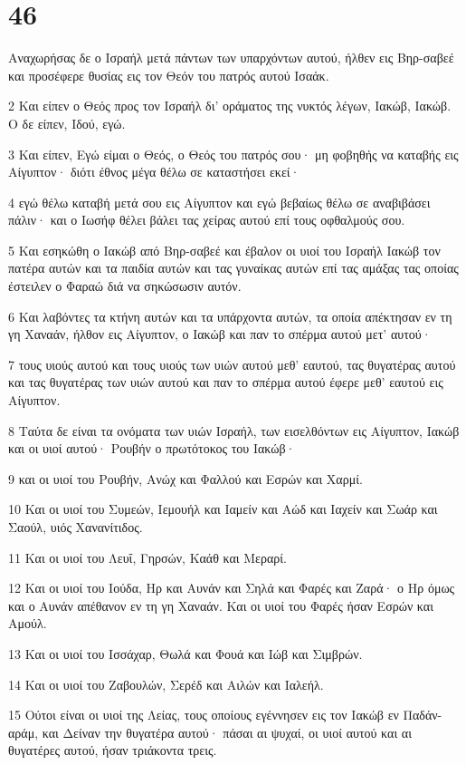 \chapter{46}

\par Αναχωρήσας δε ο Ισραήλ μετά πάντων των υπαρχόντων αυτού, ήλθεν εις Βηρ-σαβεέ και προσέφερε θυσίας εις τον Θεόν του πατρός αυτού Ισαάκ.
\par 2 Και είπεν ο Θεός προς τον Ισραήλ δι' οράματος της νυκτός λέγων, Ιακώβ, Ιακώβ. Ο δε είπεν, Ιδού, εγώ.
\par 3 Και είπεν, Εγώ είμαι ο Θεός, ο Θεός του πατρός σου· μη φοβηθής να καταβής εις Αίγυπτον· διότι έθνος μέγα θέλω σε καταστήσει εκεί·
\par 4 εγώ θέλω καταβή μετά σου εις Αίγυπτον και εγώ βεβαίως θέλω σε αναβιβάσει πάλιν· και ο Ιωσήφ θέλει βάλει τας χείρας αυτού επί τους οφθαλμούς σου.
\par 5 Και εσηκώθη ο Ιακώβ από Βηρ-σαβεέ και έβαλον οι υιοί του Ισραήλ Ιακώβ τον πατέρα αυτών και τα παιδία αυτών και τας γυναίκας αυτών επί τας αμάξας τας οποίας έστειλεν ο Φαραώ διά να σηκώσωσιν αυτόν.
\par 6 Και λαβόντες τα κτήνη αυτών και τα υπάρχοντα αυτών, τα οποία απέκτησαν εν τη γη Χαναάν, ήλθον εις Αίγυπτον, ο Ιακώβ και παν το σπέρμα αυτού μετ' αυτού·
\par 7 τους υιούς αυτού και τους υιούς των υιών αυτού μεθ' εαυτού, τας θυγατέρας αυτού και τας θυγατέρας των υιών αυτού και παν το σπέρμα αυτού έφερε μεθ' εαυτού εις Αίγυπτον.
\par 8 Ταύτα δε είναι τα ονόματα των υιών Ισραήλ, των εισελθόντων εις Αίγυπτον, Ιακώβ και οι υιοί αυτού· Ρουβήν ο πρωτότοκος του Ιακώβ·
\par 9 και οι υιοί του Ρουβήν, Ανώχ και Φαλλού και Εσρών και Χαρμί.
\par 10 Και οι υιοί του Συμεών, Ιεμουήλ και Ιαμείν και Αώδ και Ιαχείν και Σωάρ και Σαούλ, υιός Χανανίτιδος.
\par 11 Και οι υιοί του Λευΐ, Γηρσών, Καάθ και Μεραρί.
\par 12 Και οι υιοί του Ιούδα, Ηρ και Αυνάν και Σηλά και Φαρές και Ζαρά· ο Ηρ όμως και ο Αυνάν απέθανον εν τη γη Χαναάν. Και οι υιοί του Φαρές ήσαν Εσρών και Αμούλ.
\par 13 Και οι υιοί του Ισσάχαρ, Θωλά και Φουά και Ιώβ και Σιμβρών.
\par 14 Και οι υιοί του Ζαβουλών, Σερέδ και Αιλών και Ιαλεήλ.
\par 15 Ούτοι είναι οι υιοί της Λείας, τους οποίους εγέννησεν εις τον Ιακώβ εν Παδάν-αράμ, και Δείναν την θυγατέρα αυτού· πάσαι αι ψυχαί, οι υιοί αυτού και αι θυγατέρες αυτού, ήσαν τριάκοντα τρεις.
